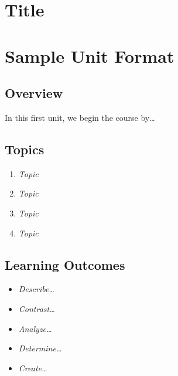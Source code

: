 \documentclass[
]{book}
\providecommand{\tightlist}{%
  \setlength{\itemsep}{0pt}\setlength{\parskip}{0pt}}
\begin{document}
\hypertarget{title-3}{%
\chapter{Title}\label{title-3}}

\hypertarget{sample-unit-format}{%
\chapter*{Sample Unit Format}\label{sample-unit-format}}

\hypertarget{overview-2}{%
\section*{Overview}\label{overview-2}}

In this first unit, we begin the course by\ldots{}

\hypertarget{topics-2}{%
\section*{Topics}\label{topics-2}}

\begin{enumerate}
\def\labelenumi{\arabic{enumi}.}
\tightlist
\item
  \emph{Topic}\\
\item
  \emph{Topic}\\
\item
  \emph{Topic}\\
\item
  \emph{Topic}
\end{enumerate}

\hypertarget{learning-outcomes-2}{%
\section*{Learning Outcomes}\label{learning-outcomes-2}}

\begin{itemize}
\tightlist
\item
  \emph{Describe\ldots{}}
\item
  \emph{Contrast\ldots{}}
\item
  \emph{Analyze\ldots{}}
\item
  \emph{Determine\ldots{}}
\item
  \emph{Create\ldots{}}
\end{itemize}
\end{document}
